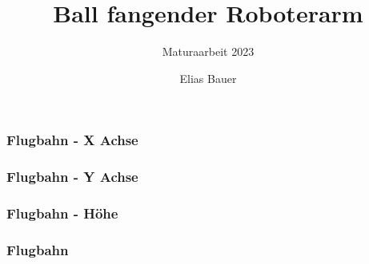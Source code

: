 \documentclass[aspectratio=169]{beamer}
\title {Ball fangender Roboterarm}
\date[Maturaarbeit]{}
\subtitle{Maturaarbeit 2023}
\author{Elias Bauer}
\institute{Kollegium St. Fidelis}
\begin{document}
\frame[plain]{\titlepage}


\begin{frame}
	\frametitle{Flugbahn - X Achse}

	\FlightPathX

\end{frame}

\begin{frame}
	\frametitle{Flugbahn - Y Achse}

	\FlightPathY

\end{frame}

\begin{frame}
	\frametitle{Flugbahn - Höhe}

	\FlightPathZ

\end{frame}

\begin{frame}
	\frametitle{Flugbahn}

	\FlightPath

\end{frame}





\end{document}
